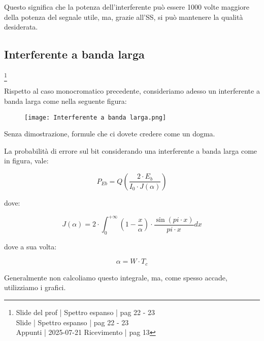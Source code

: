Questo significa che la potenza dell'interferente può essere 1000 volte maggiore della potenza del segnale utile, 
ma, grazie all'SS, 
si può mantenere la qualità desiderata. \newline 

\newpage 

\subsection{Interferente a banda larga}
\footnote{Slide del prof | Spettro espanso | pag 22 - 23\\
Slide | Spettro espanso | pag 22 - 23 \\
Appunti | 2025-07-21 Ricevimento | pag 13
} 

Rispetto al caso monocromatico precedente, 
consideriamo adesso un interferente a banda larga come nella seguente figura: 

\begin{figure}[h]
    \centering
    \texttt{[image: Interferente a banda larga.png]}
\end{figure}

\begin{tcolorbox}
    Senza dimostrazione, formule che ci dovete credere come un dogma. 
\end{tcolorbox}

La probabilità di errore sul bit considerando una interferente a banda larga come in figura, 
vale: 

{
    \Large 
    \begin{equation}
        P_{Eb}
        = 
        Q
        \left(
            \frac{2 \cdot E_b}{I_0 \cdot J(\alpha)}
        \right)
    \end{equation}
}


dove: 

{
    \Large 
    \begin{equation}
        J(\alpha)
        =
        2 \cdot 
        \int_{0}^{+ \infty}
        \left(
            1 - \frac{x}{\alpha}
        \right)
        \cdot 
        \frac{\sin(pi \cdot x)}{pi \cdot x}
        dx
    \end{equation}
}

dove a sua volta: 

{
    \Large 
    \begin{equation}
        \alpha = W \cdot T_c
    \end{equation}
}

\newpage 

Generalmente non calcoliamo questo integrale, 
ma, come spesso accade, utilizziamo i grafici. \newline

